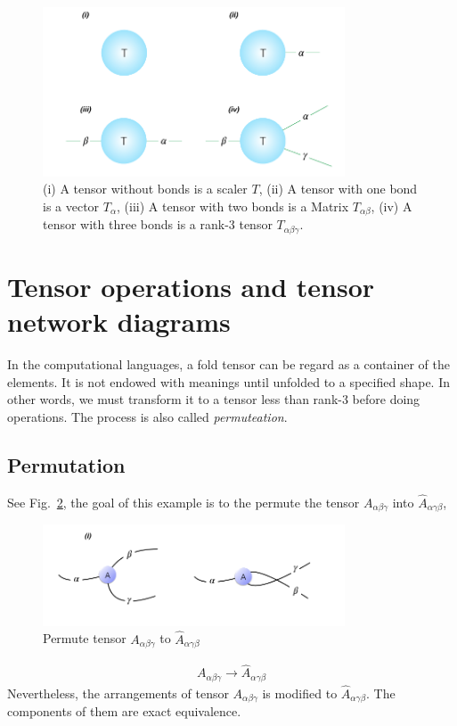 \begin{figure}[ht]
	\centering
	\includegraphics[width=0.80\textwidth]{figures/fig211.png}
	\caption[The reprecentation of commen tensors.]{(i) A tensor without bonds is a scaler $T$, (ii) A tensor with one bond is a vector $T_{\alpha}$, (iii) A tensor with two bonds is a Matrix $T_{\alpha \beta}$, (iv) A tensor with three bonds is a rank-3 tensor $T_{\alpha \beta \gamma}$.}
	\label{fig211}
\end{figure}

\section{Tensor operations and tensor network diagrams} %
\label{operation}
In the computational languages, a fold tensor can be regard as a container of the elements. It is not endowed with meanings until unfolded to a specified shape. In other words, we must transform it to a tensor less than rank-3 before doing operations. The process is also called \textit{permuteation}.

\subsection{Permutation}
See Fig.~\ref{fig224}, the goal of this example is to the permute the tensor $A_{\alpha \beta \gamma}$ into $\hat{A}_{\alpha \gamma \beta}$,
\begin{figure}[ht]
	\centering
	\includegraphics[width=0.80\textwidth]{figures/fig224.png}
	\caption[The permutation of a tensor.]{ Permute tensor $A_{\alpha \beta \gamma}$ to $\hat{A}_{\alpha \gamma \beta}$ }
	\label{fig224}
\end{figure}
\begin{align}
	A_{\alpha \beta \gamma} \rightarrow \hat{A}_{\alpha \gamma \beta}
\end{align}
Nevertheless, the arrangements of tensor $A_{\alpha \beta \gamma}$ is modified to $\hat{A}_{\alpha \gamma \beta}$. The components of them are exact equivalence. 

